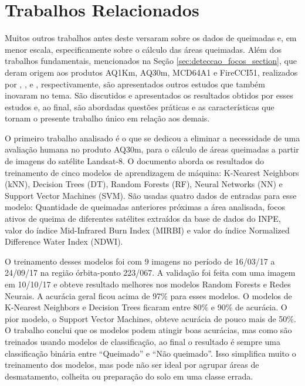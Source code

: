 \documentclass[cic,tc]{iiufrgs}
\begin{document}
\section{Trabalhos Relacionados}
\label{sec:trabalhos_relacionados}

Muitos outros trabalhos antes deste versaram sobre os dados de queimadas e, em menor escala, especificamente sobre o cálculo das áreas queimadas. Além dos trabalhos fundamentais, mencionados na Seção \ref{sec:deteccao_focos_section}, que deram origem aos produtos AQ1Km, AQ30m, MCD64A1 e FireCCI51, realizados por \citet{libonati2015algorithm}, \citet{melchiori2014landsat}, \citet{GIGLIO201872} e \citet{Lizundia2020}, respectivamente, são apresentados outros estudos que também inovaram no tema. São discutidos e apresentados os resultados obtidos por esses estudos e, ao final, são abordadas questões práticas e as características que tornam o presente trabalho único em relação aos demais.

O primeiro trabalho analisado é o \citet{dosclassificaccao} que se dedicou a eliminar a necessidade de uma avaliação humana no produto AQ30m, para o cálculo de áreas queimadas a partir de imagens do satélite Landsat-8. O documento aborda os resultados do treinamento de cinco modelos de aprendizagem de máquina: K-Nearest Neighbors (kNN), Decision Trees (DT), Random Forests (RF), Neural Networks (NN) e Support Vector Machines (SVM). São usadas quatro dados de entradas para esse modelo: Quantidade de queimadas anteriores próximas a área analisada, focos ativos de queima de diferentes satélites extraídos da base de dados do INPE, valor do índice Mid-Infrared Burn Index (MIRBI) e valor do índice Normalized Difference Water Index (NDWI).

O treinamento desses modelos foi com 9 imagens no período de 16/03/17 a 24/09/17 na região órbita-ponto 223/067. A validação foi feita com uma imagem em 10/10/17 e obteve resultado melhores nos modelos Random Forests e Redes Neurais. A acurácia geral ficou acima de 97\% para esses modelos. O modelos de K-Nearest Neighbors e Decision Trees ficaram entre 80\% e 90\% de acurácia. O pior modelo, o Support Vector Machines, obteve acurácia de pouco mais de 50\%. O trabalho conclui que os modelos podem atingir boas acurácias, mas como são treinados usando modelos de classificação, ao final o resultado é sempre uma classificação binária entre ``Queimado'' e ``Não queimado''. Isso simplifica muito o treinamento dos modelos, mas pode não ser ideal por agrupar áreas de desmatamento, colheita ou preparação do solo em uma classe errada.
\end{document}
